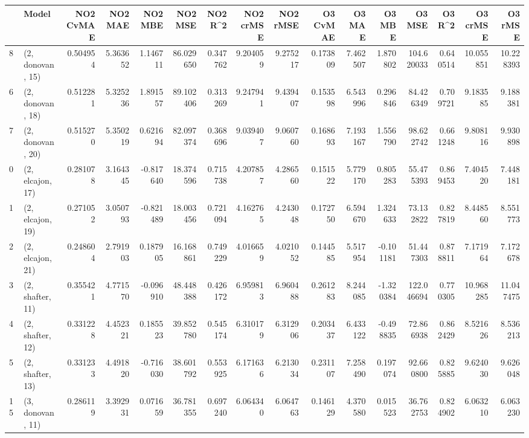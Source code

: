 \begin{tabular}{llrrrrrrrrrrrrrr}
\toprule
{} &             Model &  NO2 CvMAE &   NO2 MAE &   NO2 MBE &    NO2 MSE &   NO2 R\textasciicircum2 &  NO2 crMSE &  NO2 rMSE &  O3 CvMAE &    O3 MAE &    O3 MBE &      O3 MSE &    O3 R\textasciicircum2 &   O3 crMSE &    O3 rMSE \\
\midrule
8  &  (2, donovan, 15) &   0.504954 &  5.363652 &  1.146711 &  86.029650 &  0.347762 &   9.204059 &  9.275217 &  0.173809 &  7.462507 &  1.870802 &  104.620033 &  0.640514 &  10.055851 &  10.228393 \\
6  &  (2, donovan, 18) &   0.512281 &  5.325236 &  1.891557 &  89.102406 &  0.313269 &   9.247941 &  9.439407 &  0.153598 &  6.543996 &  0.296846 &   84.426349 &  0.709721 &   9.183585 &   9.188381 \\
7  &  (2, donovan, 20) &   0.515270 &  5.350219 &  0.621694 &  82.097374 &  0.368696 &   9.039407 &  9.060760 &  0.168693 &  7.193167 &  1.556790 &   98.622742 &  0.661248 &   9.808116 &   9.930898 \\
0  &  (2, elcajon, 17) &   0.281078 &  3.164345 & -0.817640 &  18.374596 &  0.715738 &   4.207857 &  4.286560 &  0.151522 &  5.779170 &  0.805283 &   55.475393 &  0.869453 &   7.404520 &   7.448181 \\
1  &  (2, elcajon, 19) &   0.271052 &  3.050793 & -0.821489 &  18.003456 &  0.721094 &   4.162765 &  4.243048 &  0.172750 &  6.594670 &  1.324633 &   73.132822 &  0.827819 &   8.448560 &   8.551773 \\
2  &  (2, elcajon, 21) &   0.248604 &  2.791903 &  0.187905 &  16.168861 &  0.749229 &   4.016659 &  4.021052 &  0.144585 &  5.517954 & -0.101181 &   51.447303 &  0.878811 &   7.171964 &   7.172678 \\
3  &  (2, shafter, 11) &   0.355421 &  4.771570 & -0.096910 &  48.448388 &  0.426172 &   6.959813 &  6.960488 &  0.261283 &  8.244085 & -1.320384 &  122.046694 &  0.770305 &  10.968285 &  11.047475 \\
4  &  (2, shafter, 12) &   0.331228 &  4.452321 &  0.185523 &  39.852780 &  0.545174 &   6.310179 &  6.312906 &  0.203437 &  6.433122 & -0.498835 &   72.866938 &  0.862429 &   8.521626 &   8.536213 \\
5  &  (2, shafter, 13) &   0.331233 &  4.491820 & -0.716030 &  38.601792 &  0.553925 &   6.171636 &  6.213034 &  0.231107 &  7.258490 &  0.197074 &   92.660800 &  0.825885 &   9.624030 &   9.626048 \\
15 &  (3, donovan, 11) &   0.286119 &  3.392931 &  0.071659 &  36.781355 &  0.697240 &   6.064340 &  6.064763 &  0.146129 &  4.370580 &  0.015523 &   36.762753 &  0.824902 &   6.063210 &   6.063230 \\

\end{tabular}
